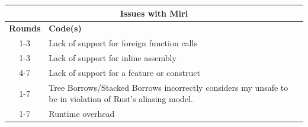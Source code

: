 \centering
\small
\begin{tabular}{|cp{10cm}|}
\hline
\multicolumn{2}{|c|}{\textbf{Issues with Miri}}                                                                                                   \\ \hline
\multicolumn{1}{|c|}{\textbf{Rounds}} & \textbf{Code(s)}                                                                                          \\ \hline
\multicolumn{1}{|c|}{1-3}             & Lack of support for foreign function calls                                                                \\ \cline{2-2} 
\multicolumn{1}{|c|}{1-3}             & Lack of support for inline assembly                                                                       \\ \cline{2-2} 
\multicolumn{1}{|c|}{4-7}             & Lack of support for a feature or construct                                                                \\ \hline
\multicolumn{1}{|c|}{1-7}             & Tree Borrows/Stacked Borrows incorrectly considers my unsafe to be in violation of Rust’s aliasing model. \\ \hline
\multicolumn{1}{|c|}{1-7}             & Runtime overhead                                                                                          \\ \hline
\end{tabular}
